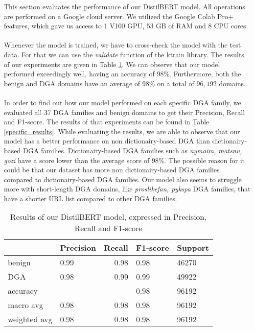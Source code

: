 This section evaluates the performance of our DistilBERT model. All operations are performed on a Google cloud server. We utilized the Google Colab Pro+ features, which gave us access to 1 V100 GPU, 53 GB of RAM and 8 CPU cores.\\\\ 
Whenever the model is trained, we have to cross-check the model with the test data. For that we can use the \textit{validate} function of the ktrain library. The results of our experiments are given in Table \ref{general_results}. We can observe that our model performed exceedingly well, having an accuracy of 98\%. Furthermore, both the benign and DGA domains have an average of 98\% on a total of $96,192$ domains.\\\\
In order to find out how our model performed on each specific DGA family, we evaluated all 37 DGA families and benign domains to get their Precision, Recall and F1-score. The results of that experiments can be found in Table \ref{specific_results}. While evaluating the results, we are able to observe that our model has a better performance on non dictionairy-based DGA than dictionairy-based DGA families. Dictionairy-based DGA families such as \textit{nymaim, matsnu, gozi} have a score lower than the average score of 98\%. The possible reason for it could be that our dataset has more non dictionairy-based DGA families compared to dictionairy-based DGA families. Our model also seems to struggle more with short-length DGA domains, like \textit{proslikefan, pykspa} DGA families, that have a shorter URL list compared to other DGA families. 


\begin{table}[!htb]
    \centering
    \begin{tabular}{llrll}
        \hline
                     & Precision & Recall & F1-score & Support \\ \hline
        benign       & 0.99      & 0.98   & 0.98     & 46270   \\
        DGA          & 0.98      & 0.99   & 0.99     & 49922   \\ \hline
        accuracy     &           &        & 0.98     & 96192   \\
        macro avg    & 0.98      & 0.98   & 0.98     & 96192   \\
        weighted avg & 0.98      & 0.98   & 0.98     & 96192   \\ \hline
    \end{tabular}
    \caption{Results of our DistilBERT model, expressed in Precision, Recall and F1-score}
    \label{general_results}
\end{table}

